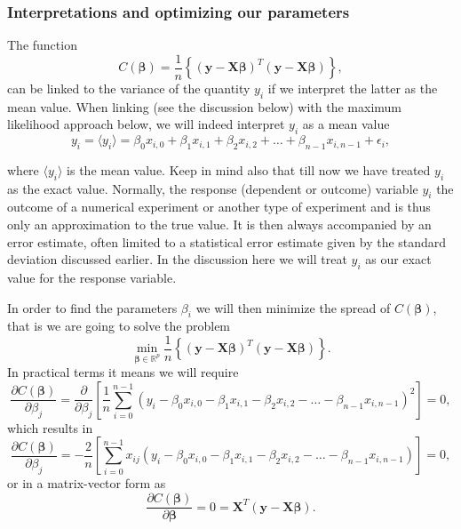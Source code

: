 \documentclass{beamer}
\begin{document}
\begin{frame}
\frametitle{Interpretations and optimizing our parameters}

\begin{block}{}

The function 
\[
C(\bm{\beta})=\frac{1}{n}\left\{\left(\bm{y}-\bm{X}\bm{\beta}\right)^T\left(\bm{y}-\bm{X}\bm{\beta}\right)\right\},
\]
can be linked to the variance of the quantity $y_i$ if we interpret the latter as the mean value. 
When linking (see the discussion below) with the maximum likelihood approach below, we will indeed interpret $y_i$ as a mean value
\[
y_{i}=\langle y_i \rangle = \beta_0x_{i,0}+\beta_1x_{i,1}+\beta_2x_{i,2}+\dots+\beta_{n-1}x_{i,n-1}+\epsilon_i,
\]

where $\langle y_i \rangle$ is the mean value. Keep in mind also that
till now we have treated $y_i$ as the exact value. Normally, the
response (dependent or outcome) variable $y_i$ the outcome of a
numerical experiment or another type of experiment and is thus only an
approximation to the true value. It is then always accompanied by an
error estimate, often limited to a statistical error estimate given by
the standard deviation discussed earlier. In the discussion here we
will treat $y_i$ as our exact value for the response variable.

In order to find the parameters $\beta_i$ we will then minimize the spread of $C(\bm{\beta})$, that is we are going to solve the problem
\[
{\displaystyle \min_{\bm{\beta}\in
{\mathbb{R}}^{p}}}\frac{1}{n}\left\{\left(\bm{y}-\bm{X}\bm{\beta}\right)^T\left(\bm{y}-\bm{X}\bm{\beta}\right)\right\}.
\]
In practical terms it means we will require
\[
\frac{\partial C(\bm{\beta})}{\partial \beta_j} = \frac{\partial }{\partial \beta_j}\left[ \frac{1}{n}\sum_{i=0}^{n-1}\left(y_i-\beta_0x_{i,0}-\beta_1x_{i,1}-\beta_2x_{i,2}-\dots-\beta_{n-1}x_{i,n-1}\right)^2\right]=0, 
\]
which results in
\[
\frac{\partial C(\bm{\beta})}{\partial \beta_j} = -\frac{2}{n}\left[ \sum_{i=0}^{n-1}x_{ij}\left(y_i-\beta_0x_{i,0}-\beta_1x_{i,1}-\beta_2x_{i,2}-\dots-\beta_{n-1}x_{i,n-1}\right)\right]=0, 
\]
or in a matrix-vector form as
\[
\frac{\partial C(\bm{\beta})}{\partial \bm{\beta}} = 0 = \bm{X}^T\left( \bm{y}-\bm{X}\bm{\beta}\right).  
\]

\end{block}
\end{frame}
\end{document}
